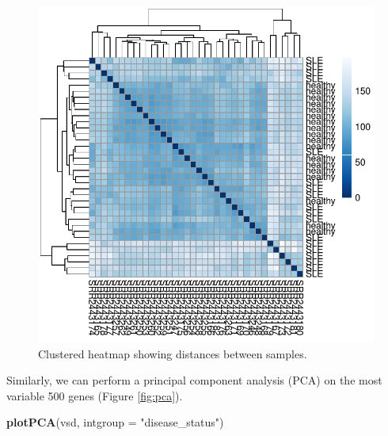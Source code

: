 \documentclass[9pt,a4paper,]{extarticle}
\newenvironment{Shaded}{\begin{snugshade}}{\end{snugshade}}
\newcommand{\KeywordTok}[1]{\textcolor[rgb]{0.13,0.29,0.53}{\textbf{#1}}}
\newcommand{\DataTypeTok}[1]{\textcolor[rgb]{0.13,0.29,0.53}{#1}}
\newcommand{\StringTok}[1]{\textcolor[rgb]{0.31,0.60,0.02}{#1}}
\newcommand{\NormalTok}[1]{#1}
\begin{document}
\begin{figure}

{\centering \includegraphics{biocondutor-regulatory-genomics-workflow_files/figure-latex/heatmap-1} 

}

\caption{Clustered heatmap showing distances between samples.}\label{fig:heatmap}
\end{figure}

Similarly, we can perform a principal component analysis (PCA) on the most variable 500 genes (Figure \ref{fig:pca}).

\begin{Shaded}
\begin{Highlighting}[]
\KeywordTok{plotPCA}\NormalTok{(vsd, }\DataTypeTok{intgroup =} \StringTok{"disease_status"}\NormalTok{)}
\end{Highlighting}
\end{Shaded}
\end{document}
